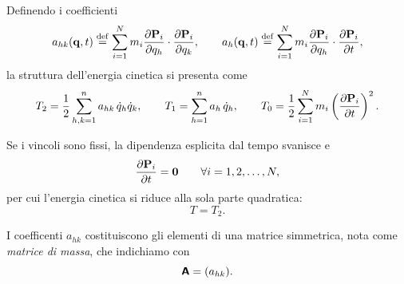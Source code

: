 Definendo i coefficienti
\begin{equation*}
    a_{hk}(\vb{q}, t) \overset{\mathrm{def}}{=} \sum_{i=1}^N m_i \pdv{\vb{P}_i}{q_h} \cdot \pdv{\vb{P}_i}{q_k}, \qquad a_{h}(\vb{q}, t) \overset{\mathrm{def}}{=} \sum_{i=1}^N m_i \pdv{\vb{P}_i}{q_h} \cdot \pdv{\vb{P}_i}{t},
\end{equation*}
la struttura dell'energia cinetica si presenta come
\begin{equation}
    T_2 = \frac{1}{2} \sum_{h,k=1}^n a_{hk}\, \dot{q}_h \dot{q}_k, \qquad T_1 = \sum_{h=1}^n a_h \,\dot{q}_h, \qquad T_0 = \frac{1}{2} \sum_{i=1}^N m_i \left(\pdv{\vb{P}_i}{t}\right)^2.
    \label{eq:energia_cinetica}
\end{equation}

Se i vincoli sono fissi, la dipendenza esplicita dal tempo svanisce e
\begin{equation*}
    \pdv{\vb{P}_i}{t} = \vb{0} \qquad \forall i = 1, 2, \dots, N,
\end{equation*} 
per cui l'energia cinetica si riduce alla sola parte quadratica: 
\begin{equation*}
    T = T_2.
\end{equation*}

\begin{definition}
    I coefficenti $a_{hk}$ costituiscono gli elementi di una matrice simmetrica, nota come \emph{matrice di massa}, che indichiamo con
    \begin{equation*}
        \boldsymbol{\mathsf{A}} = (a_{hk}).
    \end{equation*}
\end{definition}

